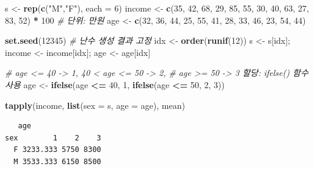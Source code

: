 \documentclass[
  11pt,
]{krantz}
\newenvironment{Shaded}{\begin{snugshade}}{\end{snugshade}}
\newcommand{\CommentTok}[1]{\textcolor[rgb]{0.37,0.37,0.37}{\textit{#1}}}
\newcommand{\DataTypeTok}[1]{\textcolor[rgb]{0.27,0.27,0.27}{#1}}
\newcommand{\DecValTok}[1]{\textcolor[rgb]{0.06,0.06,0.06}{#1}}
\newcommand{\KeywordTok}[1]{\textcolor[rgb]{0.27,0.27,0.27}{\textbf{#1}}}
\newcommand{\NormalTok}[1]{#1}
\newcommand{\OperatorTok}[1]{\textcolor[rgb]{0.43,0.43,0.43}{\textbf{#1}}}
\newcommand{\StringTok}[1]{\textcolor[rgb]{0.5,0.5,0.5}{#1}}
\begin{document}
\begin{Shaded}
\begin{Highlighting}[]
\NormalTok{s <-}\StringTok{ }\KeywordTok{rep}\NormalTok{(}\KeywordTok{c}\NormalTok{(}\StringTok{"M"}\NormalTok{,}\StringTok{"F"}\NormalTok{), }\DataTypeTok{each =} \DecValTok{6}\NormalTok{)}
\NormalTok{income <-}\StringTok{ }\KeywordTok{c}\NormalTok{(}\DecValTok{35}\NormalTok{, }\DecValTok{42}\NormalTok{, }\DecValTok{68}\NormalTok{, }\DecValTok{29}\NormalTok{, }\DecValTok{85}\NormalTok{, }\DecValTok{55}\NormalTok{, }
            \DecValTok{30}\NormalTok{, }\DecValTok{40}\NormalTok{, }\DecValTok{63}\NormalTok{, }\DecValTok{27}\NormalTok{, }\DecValTok{83}\NormalTok{, }\DecValTok{52}\NormalTok{) }\OperatorTok{*}\StringTok{ }\DecValTok{100} \CommentTok{# 단위: 만원}
\NormalTok{age <-}\StringTok{ }\KeywordTok{c}\NormalTok{(}\DecValTok{32}\NormalTok{, }\DecValTok{36}\NormalTok{, }\DecValTok{44}\NormalTok{, }\DecValTok{25}\NormalTok{, }\DecValTok{55}\NormalTok{, }\DecValTok{41}\NormalTok{, }
         \DecValTok{28}\NormalTok{, }\DecValTok{33}\NormalTok{, }\DecValTok{46}\NormalTok{, }\DecValTok{23}\NormalTok{, }\DecValTok{54}\NormalTok{, }\DecValTok{44}\NormalTok{)}

\KeywordTok{set.seed}\NormalTok{(}\DecValTok{12345}\NormalTok{) }\CommentTok{# 난수 생성 결과 고정}
\NormalTok{idx <-}\StringTok{ }\KeywordTok{order}\NormalTok{(}\KeywordTok{runif}\NormalTok{(}\DecValTok{12}\NormalTok{))}
\NormalTok{s <-}\StringTok{ }\NormalTok{s[idx]; income <-}\StringTok{ }\NormalTok{income[idx]; age <-}\StringTok{ }\NormalTok{age[idx]}

\CommentTok{# age <= 40 -> 1, 40 < age <= 50 -> 2, }
\CommentTok{# age >= 50 -> 3 할당: ifelse() 함수 사용}
\NormalTok{age <-}\StringTok{ }\KeywordTok{ifelse}\NormalTok{(age }\OperatorTok{<=}\StringTok{ }\DecValTok{40}\NormalTok{, }\DecValTok{1}\NormalTok{, }
       \KeywordTok{ifelse}\NormalTok{(age }\OperatorTok{<=}\StringTok{ }\DecValTok{50}\NormalTok{, }\DecValTok{2}\NormalTok{, }\DecValTok{3}\NormalTok{))}

\KeywordTok{tapply}\NormalTok{(income, }\KeywordTok{list}\NormalTok{(}\DataTypeTok{sex =}\NormalTok{ s, }\DataTypeTok{age =}\NormalTok{ age), mean)}
\end{Highlighting}
\end{Shaded}

\begin{verbatim}
   age
sex        1    2    3
  F 3233.333 5750 8300
  M 3533.333 6150 8500
\end{verbatim}
\end{document}
